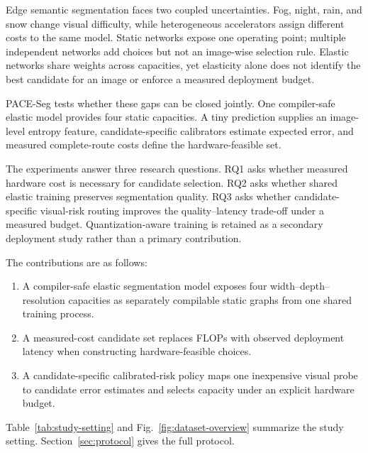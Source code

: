 \documentclass[a4paper,review,12pt]{elsarticle}
\newcommand{\method}{PACE-Seg}
\begin{document}
Edge semantic segmentation faces two coupled uncertainties. Fog, night, rain, and snow change visual difficulty, while heterogeneous accelerators assign different costs to the same model. Static networks expose one operating point; multiple independent networks add choices but not an image-wise selection rule. Elastic networks share weights across capacities, yet elasticity alone does not identify the best candidate for an image or enforce a measured deployment budget.

\method{} tests whether these gaps can be closed jointly. One compiler-safe elastic model provides four static capacities. A tiny prediction supplies an image-level entropy feature, candidate-specific calibrators estimate expected error, and measured complete-route costs define the hardware-feasible set.

The experiments answer three research questions. RQ1 asks whether measured hardware cost is necessary for candidate selection. RQ2 asks whether shared elastic training preserves segmentation quality. RQ3 asks whether candidate-specific visual-risk routing improves the quality--latency trade-off under a measured budget. Quantization-aware training is retained as a secondary deployment study rather than a primary contribution.

The contributions are as follows:
\begin{enumerate}
    \item A compiler-safe elastic segmentation model exposes four width--depth--resolution capacities as separately compilable static graphs from one shared training process.
    \item A measured-cost candidate set replaces FLOPs with observed deployment latency when constructing hardware-feasible choices.
    \item A candidate-specific calibrated-risk policy maps one inexpensive visual probe to candidate error estimates and selects capacity under an explicit hardware budget.
\end{enumerate}

Table~\ref{tab:study-setting} and Fig.~\ref{fig:dataset-overview} summarize the study setting. Section~\ref{sec:protocol} gives the full protocol.
\end{document}
